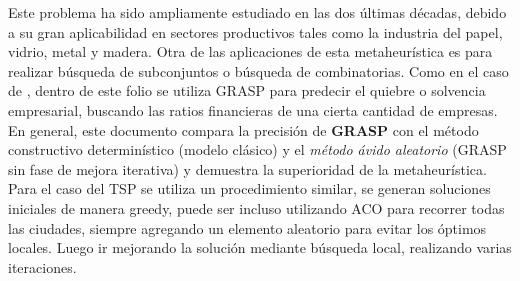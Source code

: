                 \newline
                Este problema ha sido ampliamente estudiado en las dos últimas décadas, debido a su gran aplicabilidad en sectores productivos tales como la industria del papel, vidrio, metal y madera.\parencite{GRASPGUILLOTINA}
                \newline
                \newline
                Otra de las aplicaciones de esta metaheurística es para realizar búsqueda de subconjuntos o búsqueda de combinatorias. Como en el caso de \parencite{GRASPFINANCIERO}, dentro de este folio se utiliza GRASP para predecir el quiebre o solvencia empresarial, buscando las ratios financieras de una cierta cantidad de empresas. 
                \newline
                \newline
                En general, este documento compara la precisión de \textbf{GRASP} con el método constructivo determinístico (modelo clásico) y el \textit{método ávido aleatorio} (GRASP sin fase de mejora iterativa) y demuestra la superioridad de la metaheurística. 
                \newline
                \newline
                Para el caso del TSP se utiliza un procedimiento similar, se generan soluciones iniciales de manera greedy, puede ser incluso utilizando ACO para recorrer todas las ciudades, siempre agregando un elemento aleatorio para evitar los óptimos locales. Luego ir mejorando la solución mediante búsqueda local, realizando varias iteraciones. 
                
